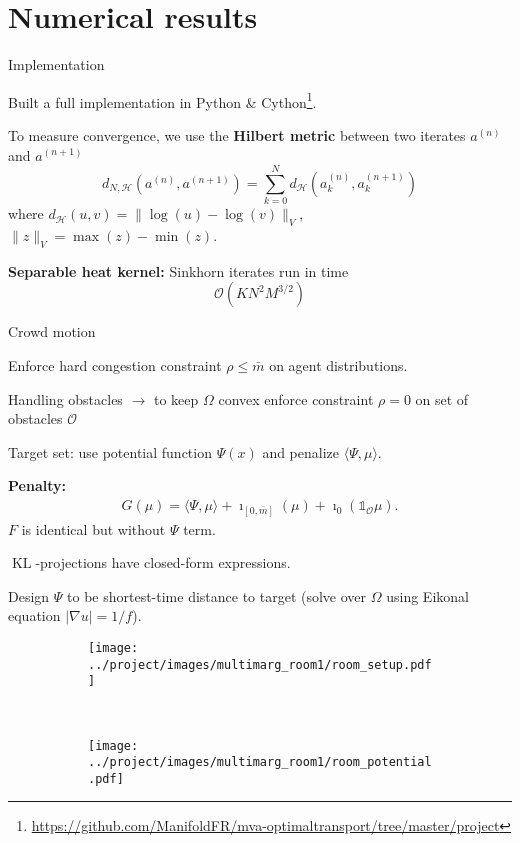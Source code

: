 \documentclass[xcolor={dvipsnames}]{beamer}
\newcommand{\calH}{\mathcal{H}}
\newcommand{\calO}{\mathcal{O}}
\DeclareMathOperator{\KL}{KL}
\newcommand{\bluefont}{\color{RoyalBlue}}
\begin{document}
\section{Numerical results}

\begin{frame}{Implementation}
	
	Built a full implementation in Python \& Cython\footnote{\url{https://github.com/ManifoldFR/mva-optimaltransport/tree/master/project}}.
	
	To measure convergence, we use the \textbf{\bluefont Hilbert metric} between two iterates $a^{(n)}$ and $a^{(n+1)}$
	\begin{equation}
		d_{N,\calH}(a^{(n)}, a^{(n+1)}) =
		\sum_{k=0}^{N}
		d_\calH(a_k^{(n)}, a_k^{(n+1)})
	\end{equation}
	where $d_\calH(u, v) = \| \log(u) - \log(v)\|_V$, $\|z\|_V = \max(z) - \min(z)$.
	
	\textbf{Separable heat kernel:} Sinkhorn iterates run in time
	\[
		\calO(KN^2 M^{3/2})
	\]
\end{frame}


\begin{frame}[allowframebreaks]{Crowd motion}
	
	Enforce hard congestion constraint $\rho \leq \bar{m}$ on agent distributions.
	
	Handling obstacles $\rightarrow$ to keep $\Omega$ convex enforce constraint $\rho = 0$ on set of obstacles $\mathscr{O}$
	
	Target set: use potential function $\Psi(x)$ and penalize $\langle \Psi, \mu\rangle$.
	
	\textbf{Penalty:}
	\begin{align*}
		G(\mu) = \langle \Psi, \mu\rangle + \imath_{[0,\bar{m}]}(\mu) + \imath_0(\mathds{1}_\mathscr{O}\mu).
	\end{align*}
	$F$ is identical but without $\Psi$ term.
	
	$\KL$-projections have closed-form expressions.
	
	\framebreak
	
	Design $\Psi$ to be shortest-time distance to target (solve over $\Omega$ using Eikonal equation $|\nabla u| = 1/f$).
	
	\begin{figure}
		\centering
		\begin{subfigure}{.45\linewidth}
			\texttt{[image: ../project/images/multimarg\_room1/room\_setup.pdf]}
		\end{subfigure}~
		\begin{subfigure}{.49\linewidth}
			\texttt{[image: ../project/images/multimarg\_room1/room\_potential.pdf]}
		\end{subfigure}
	\end{figure}
	
\end{frame}
\end{document}
